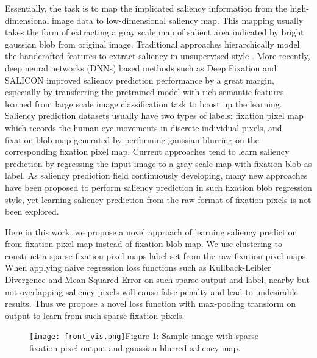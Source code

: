 \documentclass[letterpaper, 10 pt, conference]{ieeeconf}  %
\begin{document}
\par Essentially, the task is to map the implicated saliency information from the high-dimensional image data to low-dimensional saliency map. This mapping usually takes the form of extracting a gray scale map of salient area indicated by bright gaussian blob from original image. Traditional approaches hierarchically model the handcrafted features to extract saliency in unsupervised style \cite{b5}. More recently, deep neural networks (DNNs) based methods such as Deep Fixation \cite{b6} and SALICON \cite{b7} improved saliency prediction performance by a great margin, especially by transferring the pretrained model with rich semantic features learned from large scale image classification task to boost up the learning. Saliency prediction datasets usually have two types of labels: fixation pixel map which records the human eye movements in discrete individual pixels, and fixation blob map generated by performing gaussian blurring on the corresponding fixation pixel map. Current approaches tend to learn saliency prediction by regressing the input image to a gray scale map with fixation blob as label. As saliency prediction field continuously developing, many new approaches have been proposed to perform saliency prediction in such fixation blob regression style, yet learning saliency prediction from the raw format of fixation pixels is not been explored.


\par Here in this work, we propose a novel approach of learning saliency prediction from fixation pixel map instead of fixation blob map. We use clustering to construct a sparse fixation pixel maps label set from the raw fixation pixel maps.  When applying naive regression loss functions such as Kullback-Leibler Divergence and Mean Squared Error on such sparse output and label, nearby but not overlapping saliency pixels will cause false penalty and lead to undesirable results. Thus we propose a novel loss function with max-pooling transform on output to learn from such sparse fixation pixels.

\begin{figure}[!t]
\centering
    \texttt{[image: front\_vis.png]}{Figure 1: Sample image with sparse fixation pixel output and gaussian blurred saliency map.\label{fig1}}
\end{figure}
\end{document}
